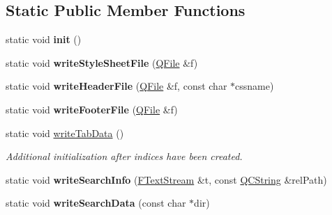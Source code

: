 \subsection*{Static Public Member Functions}
\begin{DoxyCompactItemize}
\item 
\mbox{\label{class_html_generator_a0c4c6cd48e43f74bf258851f8b109faf}} 
static void {\bfseries init} ()
\item 
\mbox{\label{class_html_generator_aa896f1b7868e05224e879ed987a122b8}} 
static void {\bfseries write\+Style\+Sheet\+File} (\mbox{\hyperlink{class_q_file}{Q\+File}} \&f)
\item 
\mbox{\label{class_html_generator_af46285b4b32be613d4eece52b8b3cb45}} 
static void {\bfseries write\+Header\+File} (\mbox{\hyperlink{class_q_file}{Q\+File}} \&f, const char $\ast$cssname)
\item 
\mbox{\label{class_html_generator_acac3dc26b34a9cacb48aa1d7bc17e532}} 
static void {\bfseries write\+Footer\+File} (\mbox{\hyperlink{class_q_file}{Q\+File}} \&f)
\item 
\mbox{\label{class_html_generator_a7306ef9abbceafd6074b4d883a59f033}} 
static void \mbox{\hyperlink{class_html_generator_a7306ef9abbceafd6074b4d883a59f033}{write\+Tab\+Data}} ()
\begin{DoxyCompactList}\small\item\em Additional initialization after indices have been created. \end{DoxyCompactList}\item 
\mbox{\label{class_html_generator_a99699bc4962554bb35a111d75b13decb}} 
static void {\bfseries write\+Search\+Info} (\mbox{\hyperlink{class_f_text_stream}{F\+Text\+Stream}} \&t, const \mbox{\hyperlink{class_q_c_string}{Q\+C\+String}} \&rel\+Path)
\item 
\mbox{\label{class_html_generator_a028225feab9ba17ccf8efe0ad3a41ee9}} 
static void {\bfseries write\+Search\+Data} (const char $\ast$dir)
\item 
\mbox{\label{class_html_generator_a1fd6971ba73b744d9ceb90478194d61d}} 

\end{DoxyCompactItemize}
